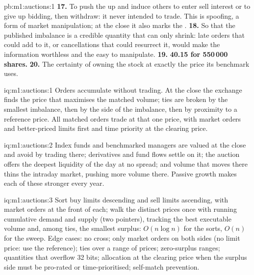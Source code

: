 \begin{solution}{pb:m1:auctions:1}
\textbf{17.} To push the  up and induce others to enter sell
interest or to give up bidding, then withdraw: it never intended to trade.
This is spoofing, a form of market manipulation; at the close it also marks
the .
\textbf{18.} So that the published imbalance is a credible quantity that can
only shrink: late orders that could add to it, or cancellations that could
resurrect it, would make the information worthless and the 
easy to manipulate.
\textbf{19.} \textbf{40.15 for 550\,000 shares.}
\textbf{20.} The certainty of owning the stock at exactly the price its
benchmark uses.
\end{solution}

\begin{solution}{iq:m1:auctions:1}
Orders accumulate without trading. At the close the exchange finds the price
that maximises the matched volume; ties are broken by the smallest imbalance,
then by the side of the imbalance, then by proximity to a reference price.
All matched orders trade at that one price, with market orders and
better-priced limits first and time priority at the clearing price.
\end{solution}

\begin{solution}{iq:m1:auctions:2}
Index funds and benchmarked managers are valued at the close and avoid
 by trading there; derivatives and fund flows settle on it; the
auction offers the deepest liquidity of the day at no spread; and volume that
moves there thins the intraday market, pushing more volume there. Passive
growth makes each of these stronger every year.
\end{solution}

\begin{solution}{iq:m1:auctions:3}
Sort buy limits descending and sell limits ascending, with market orders at
the front of each; walk the distinct prices once with running cumulative
demand and supply (two pointers), tracking the best executable volume and,
among ties, the smallest surplus: $O(n\log n)$ for the sorts, $O(n)$ for the
sweep. Edge cases: no cross; only market orders on both sides (no limit
price: use the reference); ties over a range of prices; zero-surplus ranges;
quantities that overflow 32 bits; allocation at the clearing price when the
surplus side must be pro-rated or time-prioritised; self-match prevention.
\end{solution}

